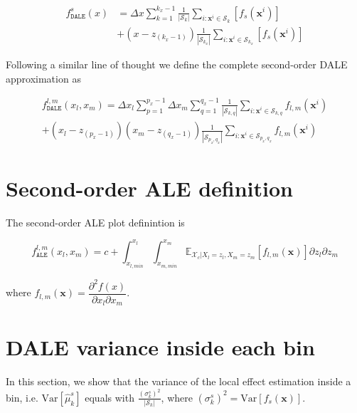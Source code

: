 \documentclass[runningheads, envcountsame, a4paper]{llncs}
\newcommand{\Xc}{\mathcal{X}_c}
\newcommand{\xb}{\mathbf{x}}
\begin{document}
\begin{equation}
  \begin{split}
  f_{\mathtt{DALE}}^s(x) &= \Delta x \sum_{k=1}^{k_x-1} \frac{1}{|\mathcal{S}_k|}
  \sum_{i:\xb^i \in \mathcal{S}_k} [f_s(\xb^i)]\\
  & + (x-z_{(k_x-1)}) \frac{1}{|\mathcal{S}_{k_x}|} \sum_{i:\xb^i \in
    \mathcal{S}_{k_x}} [f_s(\xb^i)]
  \end{split}
  \label{eq:DALE_first_order_complete}
\end{equation}

\noindent
Following a similar line of thought we define the complete second-order DALE approximation as

\begin{multline}
  f_{\mathtt{DALE}}^{l,m}(x_l, x_m) = \Delta x_l\sum_{p=1}^{p_x-1} \Delta x_m\sum_{q=1}^{q_x-1} \frac{1}{|\mathcal{S}_{k,q}|} \sum_{i:\xb^i \in \mathcal{S}_{k,q}}f_{l,m}(\xb^i)\\
  + (x_l-z_{(p_x-1)})(x_m-z_{(q_x-1)}) \frac{1}{|\mathcal{S}_{p_x,q_x}|} \sum_{i:\xb^i \in \mathcal{S}_{p_x,q_x}}f_{l,m}(\xb^i)
 \label{eq:DALE_second_order_complete}
\end{multline}

\section{Second-order ALE definition}

The second-order ALE plot definintion is

\begin{equation}
  f_{\mathtt{ALE}}^{l,m}(x_l, x_m) = c + \int_{x_{l, min}}^{x_l} \int_{x_{m, min}}^{x_m} \mathbb{E}_{\Xc|X_l=z_l,
      X_m=z_m}[f_{l,m}(\xb)] \partial z_l \partial z_m
  \label{eq:ALE2}
\end{equation}

\noindent

where
\( f_{l,m}(\xb) = \dfrac{\partial^2f(x)}{\partial x_l \partial x_m} \).

\section{DALE variance inside each bin}

In this section, we show that the variance of the local effect
estimation inside a bin, i.e. \(\mathrm{Var}[\hat{\mu}_k^s]\) equals
with \(\frac{(\sigma_k^s)^2}{|\mathcal{S}_k|}\), where
\((\sigma_k^s)^2 = \mathrm{Var}[f_s(\mathbf{x})]\).
\end{document}
